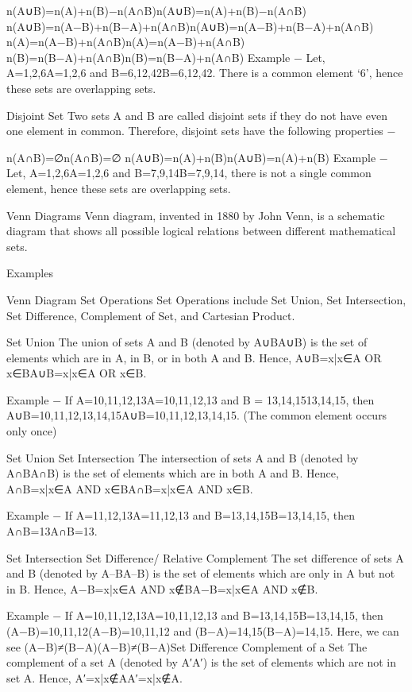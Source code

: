 \documentclass[12pt]{article}
\begin{document}
{n(A∪B)=n(A)+n(B)−n(A∩B)n(A∪B)=n(A)+n(B)−n(A∩B)
n(A∪B)=n(A−B)+n(B−A)+n(A∩B)n(A∪B)=n(A−B)+n(B−A)+n(A∩B)
n(A)=n(A−B)+n(A∩B)n(A)=n(A−B)+n(A∩B)
n(B)=n(B−A)+n(A∩B)n(B)=n(B−A)+n(A∩B)
Example − Let, A={1,2,6}A={1,2,6} and B={6,12,42}B={6,12,42}. There is a common element ‘6’, hence these sets are overlapping sets.

Disjoint Set
Two sets A and B are called disjoint sets if they do not have even one element in common. Therefore, disjoint sets have the following properties −

n(A∩B)=∅n(A∩B)=∅
n(A∪B)=n(A)+n(B)n(A∪B)=n(A)+n(B)
Example − Let, A={1,2,6}A={1,2,6} and B={7,9,14}B={7,9,14}, there is not a single common element, hence these sets are overlapping sets.

Venn Diagrams
Venn diagram, invented in 1880 by John Venn, is a schematic diagram that shows all possible logical relations between different mathematical sets.

Examples

Venn Diagram
Set Operations
Set Operations include Set Union, Set Intersection, Set Difference, Complement of Set, and Cartesian Product.

Set Union
The union of sets A and B (denoted by A∪BA∪B) is the set of elements which are in A, in B, or in both A and B. Hence, A∪B={x|x∈A OR x∈B}A∪B={x|x∈A OR x∈B}.

Example − If A={10,11,12,13}A={10,11,12,13} and B = {13,14,15}{13,14,15}, then A∪B={10,11,12,13,14,15}A∪B={10,11,12,13,14,15}. (The common element occurs only once)

Set Union
Set Intersection
The intersection of sets A and B (denoted by A∩BA∩B) is the set of elements which are in both A and B. Hence, A∩B={x|x∈A AND x∈B}A∩B={x|x∈A AND x∈B}.

Example − If A={11,12,13}A={11,12,13} and B={13,14,15}B={13,14,15}, then A∩B={13}A∩B={13}.

Set Intersection
Set Difference/ Relative Complement
The set difference of sets A and B (denoted by A–BA–B) is the set of elements which are only in A but not in B. Hence, A−B={x|x∈A AND x∉B}A−B={x|x∈A AND x∉B}.

Example − If A={10,11,12,13}A={10,11,12,13} and B={13,14,15}B={13,14,15}, then (A−B)={10,11,12}(A−B)={10,11,12} and (B−A)={14,15}(B−A)={14,15}. Here, we can see (A−B)≠(B−A)(A−B)≠(B−A)Set Difference
Complement of a Set
The complement of a set A (denoted by A′A′) is the set of elements which are not in set A. Hence, A′={x|x∉A}A′={x|x∉A}.

}
\end{document}
